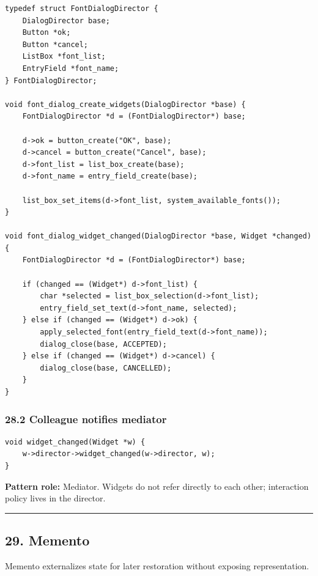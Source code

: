 \documentclass[11pt]{article}
\begin{document}
\begin{verbatim}
typedef struct FontDialogDirector {
    DialogDirector base;
    Button *ok;
    Button *cancel;
    ListBox *font_list;
    EntryField *font_name;
} FontDialogDirector;

void font_dialog_create_widgets(DialogDirector *base) {
    FontDialogDirector *d = (FontDialogDirector*) base;

    d->ok = button_create("OK", base);
    d->cancel = button_create("Cancel", base);
    d->font_list = list_box_create(base);
    d->font_name = entry_field_create(base);

    list_box_set_items(d->font_list, system_available_fonts());
}

void font_dialog_widget_changed(DialogDirector *base, Widget *changed) {
    FontDialogDirector *d = (FontDialogDirector*) base;

    if (changed == (Widget*) d->font_list) {
        char *selected = list_box_selection(d->font_list);
        entry_field_set_text(d->font_name, selected);
    } else if (changed == (Widget*) d->ok) {
        apply_selected_font(entry_field_text(d->font_name));
        dialog_close(base, ACCEPTED);
    } else if (changed == (Widget*) d->cancel) {
        dialog_close(base, CANCELLED);
    }
}
\end{verbatim}

\subsubsection{28.2 Colleague notifies mediator}\label{colleague-notifies-mediator}

\begin{verbatim}
void widget_changed(Widget *w) {
    w->director->widget_changed(w->director, w);
}
\end{verbatim}

\textbf{Pattern role:} Mediator. Widgets do not refer directly to each other; interaction policy lives in the director.

\begin{center}\rule{0.5\linewidth}{0.5pt}\end{center}

\subsection{29. Memento}\label{memento}

Memento externalizes state for later restoration without exposing representation.
\end{document}
